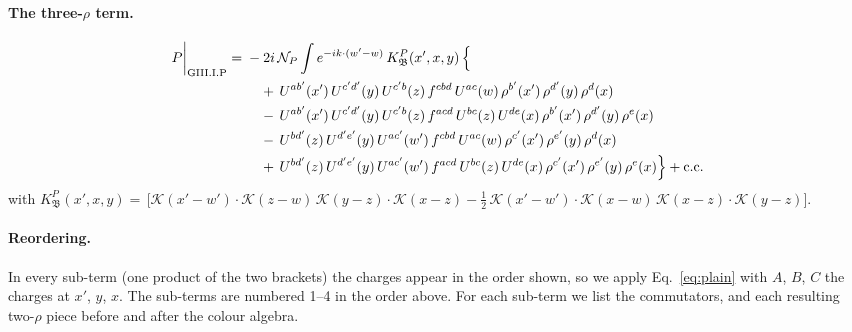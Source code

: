 \documentclass[10pt]{article}
\numberwithin{equation}{section}
\newcommand{\KK}{\mathcal K}
\newcommand{\NP}{\mathcal N_{P}}
\begin{document}
\paragraph{The three-$\rho$ term.}
\begin{align}
P\bigg|_{\rm GIII.I.P}={}&-2i\,\NP\int e^{-ik\cdot(w'-w)}\,K^{P}_{\mathfrak B}(x',x,y)\,\Big\{\notag\\
&\quad +\,U^{ab'}(x')\,U^{c'd'}(y)\,U^{c'b}(z)\,f^{cbd}\,U^{ac}(w)\,\rho^{b'}(x')\,\rho^{d'}(y)\,\rho^{d}(x)\notag\\
&\quad -\,U^{ab'}(x')\,U^{c'd'}(y)\,U^{c'b}(z)\,f^{acd}\,U^{bc}(z)\,U^{de}(x)\,\rho^{b'}(x')\,\rho^{d'}(y)\,\rho^{e}(x)\notag\\
&\quad -\,U^{bd'}(z)\,U^{d'e'}(y)\,U^{ac'}(w')\,f^{cbd}\,U^{ac}(w)\,\rho^{c'}(x')\,\rho^{e'}(y)\,\rho^{d}(x)\notag\\
&\quad +\,U^{bd'}(z)\,U^{d'e'}(y)\,U^{ac'}(w')\,f^{acd}\,U^{bc}(z)\,U^{de}(x)\,\rho^{c'}(x')\,\rho^{e'}(y)\,\rho^{e}(x)\Big\}+{\rm c.c.}\label{eq:in-GIII.I.P}
\end{align}
with $K^{P}_{\mathfrak B}(x',x,y)=\,\Big[\KK(x'-w')\cdot\KK(z-w)\,\KK(y-z)\cdot\KK(x-z)-\frac{1}{2}\,\KK(x'-w')\cdot\KK(x-w)\,\KK(x-z)\cdot\KK(y-z)\Big]$.
\paragraph{Reordering.} In every sub-term (one product of the two brackets) the charges appear in the order shown, so we apply Eq.~\eqref{eq:plain} with $A$, $B$, $C$ the charges at $x'$, $y$, $x$. The sub-terms are numbered 1--4 in the order above. For each sub-term we list the commutators, and each resulting two-$\rho$ piece before and after the colour algebra.
\end{document}
